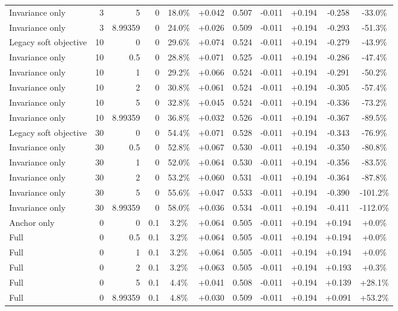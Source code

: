 \begin{table}[htbp]
\begin{tabular}{lrrrccccccc}
Invariance only & 3 & 5 & 0 & 18.0\% & +0.042 & 0.507 & -0.011 & +0.194 & -0.258 & -33.0\% \\
Invariance only & 3 & 8.99359 & 0 & 24.0\% & +0.026 & 0.509 & -0.011 & +0.194 & -0.293 & -51.3\% \\
Legacy soft objective & 10 & 0 & 0 & 29.6\% & +0.074 & 0.524 & -0.011 & +0.194 & -0.279 & -43.9\% \\
Invariance only & 10 & 0.5 & 0 & 28.8\% & +0.071 & 0.525 & -0.011 & +0.194 & -0.286 & -47.4\% \\
Invariance only & 10 & 1 & 0 & 29.2\% & +0.066 & 0.524 & -0.011 & +0.194 & -0.291 & -50.2\% \\
Invariance only & 10 & 2 & 0 & 30.8\% & +0.061 & 0.524 & -0.011 & +0.194 & -0.305 & -57.4\% \\
Invariance only & 10 & 5 & 0 & 32.8\% & +0.045 & 0.524 & -0.011 & +0.194 & -0.336 & -73.2\% \\
Invariance only & 10 & 8.99359 & 0 & 36.8\% & +0.032 & 0.526 & -0.011 & +0.194 & -0.367 & -89.5\% \\
Legacy soft objective & 30 & 0 & 0 & 54.4\% & +0.071 & 0.528 & -0.011 & +0.194 & -0.343 & -76.9\% \\
Invariance only & 30 & 0.5 & 0 & 52.8\% & +0.067 & 0.530 & -0.011 & +0.194 & -0.350 & -80.8\% \\
Invariance only & 30 & 1 & 0 & 52.0\% & +0.064 & 0.530 & -0.011 & +0.194 & -0.356 & -83.5\% \\
Invariance only & 30 & 2 & 0 & 53.2\% & +0.060 & 0.531 & -0.011 & +0.194 & -0.364 & -87.8\% \\
Invariance only & 30 & 5 & 0 & 55.6\% & +0.047 & 0.533 & -0.011 & +0.194 & -0.390 & -101.2\% \\
Invariance only & 30 & 8.99359 & 0 & 58.0\% & +0.036 & 0.534 & -0.011 & +0.194 & -0.411 & -112.0\% \\
Anchor only & 0 & 0 & 0.1 & 3.2\% & +0.064 & 0.505 & -0.011 & +0.194 & +0.194 & +0.0\% \\
Full & 0 & 0.5 & 0.1 & 3.2\% & +0.064 & 0.505 & -0.011 & +0.194 & +0.194 & +0.0\% \\
Full & 0 & 1 & 0.1 & 3.2\% & +0.064 & 0.505 & -0.011 & +0.194 & +0.194 & +0.0\% \\
Full & 0 & 2 & 0.1 & 3.2\% & +0.063 & 0.505 & -0.011 & +0.194 & +0.193 & +0.3\% \\
Full & 0 & 5 & 0.1 & 4.4\% & +0.041 & 0.508 & -0.011 & +0.194 & +0.139 & +28.1\% \\
Full & 0 & 8.99359 & 0.1 & 4.8\% & +0.030 & 0.509 & -0.011 & +0.194 & +0.091 & +53.2\% \\

\end{tabular}
\end{table}
